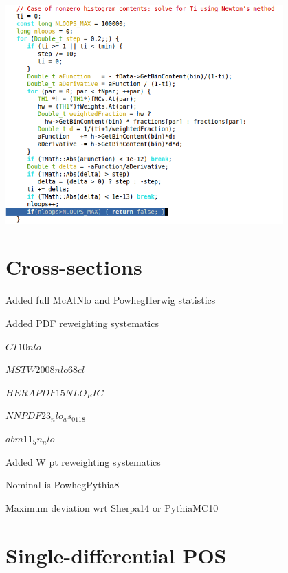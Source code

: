 {
\centering
\includegraphics[width=0.8\textwidth]{dates/20121219/figures/pull/code.png}
}




\section{ Cross-sections }
{
\iteb
\item Added full McAtNlo and PowhegHerwig statistics
\item Added PDF reweighting systematics
\iteb
\item $CT10nlo$
\item $MSTW2008nlo68cl$
\item $HERAPDF15NLO_EIG$
\item $NNPDF23_nlo_as_0118$
\item $abm11_5n_nlo$
\itee
\item Added W pt reweighting systematics
\iteb
\item Nominal is PowhegPythia8
\item Maximum deviation wrt Sherpa14 or PythiaMC10
\itee
\itee
}


\section{ Single-differential POS }

